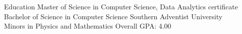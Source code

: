 \begin{rSection}{Education}
	Master of Science in Computer Science, Data Analytics certificate \hfill {}\\
	Bachelor of Science in Computer Science \hfill {Southern Adventist University}\\
	Minors in Physics and Mathematics \hfill {Overall GPA: 4.00}
\end{rSection}